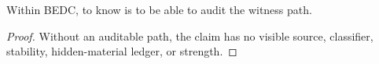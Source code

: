 \begin{corollary}
\label{cor:philosophy-to-know-is-to-audit}
Within BEDC, to know is to be able to audit the witness path.
\end{corollary}
\begin{proof}
Without an auditable path, the claim has no visible source,
classifier, stability, hidden-material ledger, or strength.
\end{proof}

